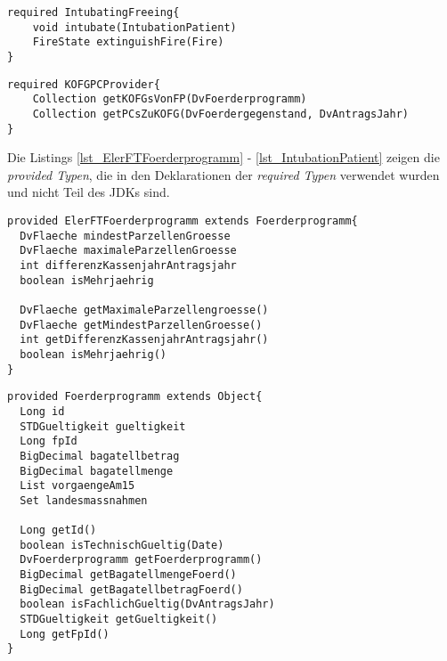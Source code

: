 \begin{lstlisting}[style = dsl, caption = Deklartion von IntubatingPatientFireFighter, captionpos = b, label = lst_tei6]
required IntubatingFreeing{
	void intubate(IntubationPatient)
	FireState extinguishFire(Fire)
}
\end{lstlisting}
\begin{lstlisting}[style = dsl, caption = Deklartion von KOFGPCProvider, captionpos = b, label = lst_tei7]
required KOFGPCProvider{
	Collection getKOFGsVonFP(DvFoerderprogramm)
	Collection getPCsZuKOFG(DvFoerdergegenstand, DvAntragsJahr)
}
\end{lstlisting}
\noindent
Die Listings \ref{lst_ElerFTFoerderprogramm} - \ref{lst_IntubationPatient} zeigen die \emph{provided Typen}, die in den Deklarationen der \emph{required Typen} verwendet wurden und nicht Teil des JDKs sind.
\begin{lstlisting}[style = dsl, caption = Deklartion von ElerFTFoerderprogramm, captionpos = b, label = lst_ElerFTFoerderprogramm]
provided ElerFTFoerderprogramm extends Foerderprogramm{
  DvFlaeche mindestParzellenGroesse
  DvFlaeche maximaleParzellenGroesse
  int differenzKassenjahrAntragsjahr
  boolean isMehrjaehrig
  
  DvFlaeche getMaximaleParzellengroesse()
  DvFlaeche getMindestParzellenGroesse()
  int getDifferenzKassenjahrAntragsjahr()
  boolean isMehrjaehrig()
}
\end{lstlisting}
\begin{lstlisting}[style = dsl, caption = Deklartion von Foerderprogramm, captionpos = b, label = lst_Foerderprogramm]
provided Foerderprogramm extends Object{
  Long id
  STDGueltigkeit gueltigkeit
  Long fpId
  BigDecimal bagatellbetrag
  BigDecimal bagatellmenge
  List vorgaengeAm15
  Set landesmassnahmen
  
  Long getId()
  boolean isTechnischGueltig(Date)
  DvFoerderprogramm getFoerderprogramm()
  BigDecimal getBagatellmengeFoerd()
  BigDecimal getBagatellbetragFoerd()
  boolean isFachlichGueltig(DvAntragsJahr)
  STDGueltigkeit getGueltigkeit()
  Long getFpId()
}
\end{lstlisting}
